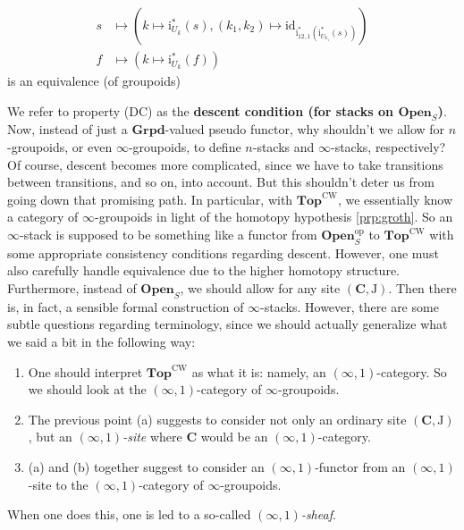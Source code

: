 \begin{exa}
\begin{enumerate}
\begin{align*}
  s
  &\mapsto
  \left(
    k
    \mapsto
    \mathrm{i}_{U_{k}}^{\ast}(s),
    (k_{1},k_{2})
    \mapsto
    \mathrm{id}_{\mathrm{i}_{12,1}^{\ast}\left( \mathrm{i}_{U_{k_{1}}}^{\ast}(s) \right)}
  \right)
  \\
  f
  &\mapsto
  \left(
    k
    \mapsto
    \mathrm{i}_{U_{k}}^{\ast}(f)
  \right)
\end{align*}
is an equivalence (of groupoids)
\end{enumerate}
We refer to property (DC) as the \textbf{descent condition (for stacks on $\mathbf{Open}_{S}$)}.
\\
Now, instead of just a $\mathbf{Grpd}$-valued pseudo functor, why shouldn't we allow for $n$-groupoids, or even $\infty$-groupoids, to define $n$-stacks and $\infty$-stacks, respectively?
Of course, descent becomes more complicated, since we have to take transitions between transitions, and so on, into account.
But this shouldn't deter us from going down that promising path.
In particular, with $\mathbf{Top}^{\textrm{CW}}$, we essentially know a category of $\infty$-groupoids in light of the homotopy hypothesis \ref{prp:groth}.
So an $\infty$-stack is supposed to be something like a functor from $\mathbf{Open}_{S}^{\mathrm{op}}$ to $\mathbf{Top}^{\textrm{CW}}$ with some appropriate consistency conditions regarding descent.
However, one must also carefully handle {\glqq}equivalence{\grqq} due to the higher homotopy structure.
Furthermore, instead of $\mathbf{Open}_{S}$, we should allow for any site $(\mathbf{C},\mathrm{J})$.
Then there is, in fact, a sensible formal construction of $\infty$-stacks.
However, there are some subtle questions regarding terminology, since we should actually generalize what we said a bit in the following way:
\begin{enumerate}
\item[(a)]
One should interpret $\mathbf{Top}^{\textrm{CW}}$ as what it is: namely, an $(\infty,1)$-category.
So we should look at the $(\infty,1)$-category of $\infty$-groupoids.
\item[(b)]
The previous point (a) suggests to consider not only an ordinary site $(\mathbf{C},\mathrm{J})$, but an \textit{$(\infty,1)$-site} where $\mathbf{C}$ would be an $(\infty,1)$-category.
\item[(c)]
(a) and (b) together suggest to consider an $(\infty,1)$-functor from an $(\infty,1)$-site to the $(\infty,1)$-category of $\infty$-groupoids.
\end{enumerate}
When one does this, one is led to a so-called \textit{$(\infty,1)$-sheaf}.

\end{exa}
